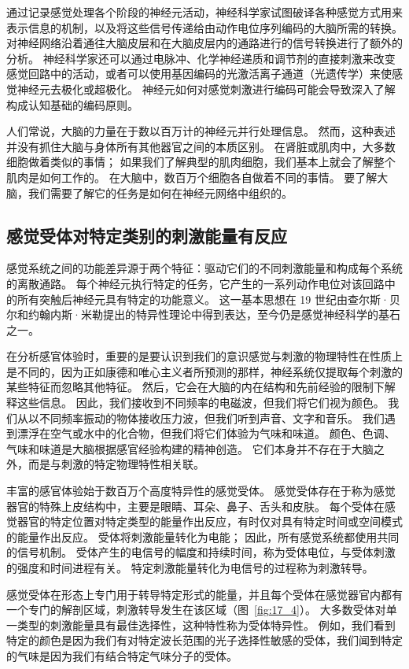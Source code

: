 通过记录感觉处理各个阶段的神经元活动，神经科学家试图破译各种感觉方式用来表示信息的机制，以及将这些信号传递给由动作电位序列编码的大脑所需的转换。 
对神经网络沿着通往大脑皮层和在大脑皮层内的通路进行的信号转换进行了额外的分析。 
神经科学家还可以通过电脉冲、化学神经递质和调节剂的直接刺激来改变感觉回路中的活动，或者可以使用基因编码的光激活离子通道（光遗传学）来使感觉神经元去极化或超极化。 
神经元如何对感觉刺激进行编码可能会导致深入了解构成认知基础的编码原则。


人们常说，大脑的力量在于数以百万计的神经元并行处理信息。 
然而，这种表述并没有抓住大脑与身体所有其他器官之间的本质区别。 
在肾脏或肌肉中，大多数细胞做着类似的事情； 
如果我们了解典型的肌肉细胞，我们基本上就会了解整个肌肉是如何工作的。 
在大脑中，数百万个细胞各自做着不同的事情。 
要了解大脑，我们需要了解它的任务是如何在神经元网络中组织的。



\subsection{感觉受体对特定类别的刺激能量有反应}

感觉系统之间的功能差异源于两个特征：驱动它们的不同刺激能量和构成每个系统的离散通路。 
每个神经元执行特定的任务，它产生的一系列动作电位对该回路中的所有突触后神经元具有特定的功能意义。 
这一基本思想在 19 世纪由查尔斯·贝尔和约翰内斯·米勒提出的特异性理论中得到表达，至今仍是感觉神经科学的基石之一。


在分析感官体验时，重要的是要认识到我们的意识感觉与刺激的物理特性在性质上是不同的，因为正如康德和唯心主义者所预测的那样，神经系统仅提取每个刺激的某些特征而忽略其他特征。 
然后，它会在大脑的内在结构和先前经验的限制下解释这些信息。 
因此，我们接收到不同频率的电磁波，但我们将它们视为颜色。 
我们从以不同频率振动的物体接收压力波，但我们听到声音、文字和音乐。 
我们遇到漂浮在空气或水中的化合物，但我们将它们体验为气味和味道。 
颜色、色调、气味和味道是大脑根据感官经验构建的精神创造。 
它们本身并不存在于大脑之外，而是与刺激的特定物理特性相关联。


丰富的感官体验始于数百万个高度特异性的感觉受体。 
感觉受体存在于称为感觉器官的特殊上皮结构中，主要是眼睛、耳朵、鼻子、舌头和皮肤。 
每个受体在感觉器官的特定位置对特定类型的能量作出反应，有时仅对具有特定时间或空间模式的能量作出反应。 
受体将刺激能量转化为电能； 
因此，所有感觉系统都使用共同的信号机制。 
受体产生的电信号的幅度和持续时间，称为受体电位，与受体刺激的强度和时间进程有关。
特定刺激能量转化为电信号的过程称为刺激转导。


感觉受体在形态上专门用于转导特定形式的能量，并且每个受体在感觉器官内都有一个专门的解剖区域，刺激转导发生在该区域（图~\ref{fig:17_4}）。 
大多数受体对单一类型的刺激能量具有最佳选择性，这种特性称为受体特异性。
例如，我们看到特定的颜色是因为我们有对特定波长范围的光子选择性敏感的受体，我们闻到特定的气味是因为我们有结合特定气味分子的受体。


